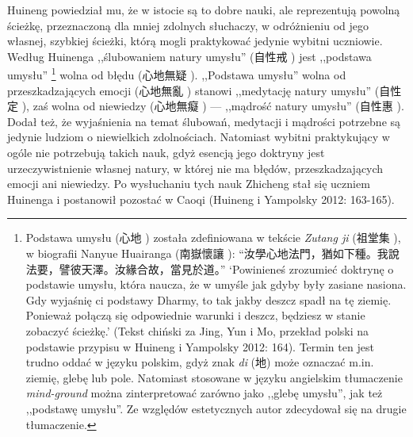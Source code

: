 Huineng powiedział mu, że w istocie są to dobre nauki, ale reprezentują powolną ścieżkę, przeznaczoną dla mniej zdolnych słuchaczy, w odróżnieniu od jego własnej, szybkiej ścieżki, którą mogli praktykować jedynie wybitni uczniowie.
Według Huinenga ,,ślubowaniem natury umysłu'' (自性戒 ) jest ,,podstawa umysłu''%
\footnote{Podstawa umysłu (心地 ) została zdefiniowana w tekście \textit{Zutang ji} (祖堂集 ), w biografii Nanyue Huairanga (南嶽懷讓 ): “汝學心地法門，猶如下種。我說法要，譬彼天澤。汝緣合故，當見於道。”
`Powinieneś zrozumieć doktrynę o podstawie umysłu, która naucza, że w umyśle jak gdyby były zasiane nasiona. Gdy wyjaśnię ci podstawy Dharmy, to tak jakby deszcz spadł na tę ziemię. Ponieważ połączą się odpowiednie warunki i deszcz, będziesz w stanie zobaczyć ścieżkę.' (Tekst chiński za Jing, Yun i Mo, przekład polski na podstawie przypisu w Huineng i Yampolsky 2012: 164). Termin ten jest trudno oddać w języku polskim, gdyż znak \textit{di} (地) może oznaczać m.in. ziemię, glebę lub pole. Natomiast stosowane w języku angielskim tłumaczenie \textit{mind-ground} można zinterpretować zarówno jako ,,glebę umysłu'', jak też ,,podstawę umysłu''. Ze względów estetycznych autor zdecydował się na drugie tłumaczenie.}
wolna od błędu (心地無疑 ).
,,Podstawa umysłu'' wolna od przeszkadzających emocji (心地無亂 ) stanowi ,,medytację natury umysłu'' (自性定 ), zaś wolna od niewiedzy (心地無癡 ) --- ,,mądrość natury umysłu'' (自性惠 ).
Dodał też, że wyjaśnienia na temat ślubowań, medytacji i mądrości potrzebne są jedynie ludziom o niewielkich zdolnościach.
Natomiast wybitni praktykujący w ogóle nie potrzebują takich nauk, gdyż esencją jego doktryny jest urzeczywistnienie własnej natury, w której nie ma błędów, przeszkadzających emocji ani niewiedzy.
Po wysłuchaniu tych nauk Zhicheng stał się uczniem Huinenga i postanowił pozostać w Caoqi
(Huineng i Yampolsky 2012: 163-165).

